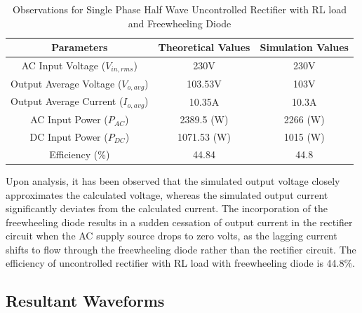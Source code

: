 \begin{table}[h]
    \renewcommand{\arraystretch}{1.3}
    \label{table_observation_single-phase-half-wave-uncontrolled-rectifier-with-RL-load-and-freewheeling-diode}
    \centering
    \begin{tabular}{|c|c|c|}
        \hline
        Parameters                              & Theoretical Values & Simulation Values \\
        \hline
        \hline
        AC Input Voltage ($ V_{in,rms} $)       & 230V               & 230V              \\
        \hline
        Output Average Voltage ($ V_{o,avg} $)  & 103.53V            & 103V              \\
        \hline
        Output Average Current ($ I_{o,avg}  $) & 10.35A             & 10.3A             \\
        \hline
        AC Input Power ($ P_{AC}  $)            & 2389.5 (W)         & 2266 (W)          \\
        \hline
        DC Input Power ($ P_{DC}  $)            & 1071.53 (W)        & 1015 (W)          \\
        \hline
        Efficiency (\%)                         & 44.84              & 44.8              \\
        \hline
    \end{tabular}
    \caption{Observations for Single Phase Half Wave Uncontrolled Rectifier with RL load and Freewheeling Diode}

\end{table}



Upon analysis, it has been observed that the simulated output voltage closely approximates the calculated voltage, whereas the simulated output current significantly deviates from the calculated current. The incorporation of the freewheeling diode results in a sudden cessation of output current in the rectifier circuit when the AC supply source drops to zero volts, as the lagging current shifts to flow through the freewheeling diode rather than the rectifier circuit.
The efficiency of uncontrolled rectifier with RL load with freewheeling diode is 44.8\%.

\pagebreak

\subsection{Resultant Waveforms}


